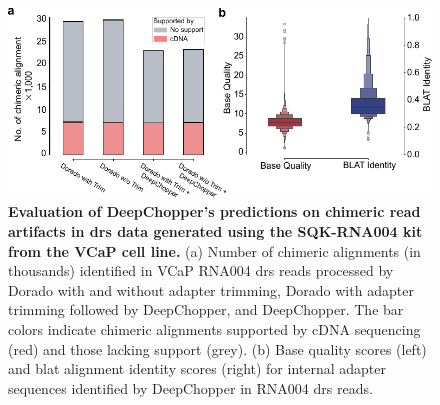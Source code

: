 \documentclass[pdflatex,sn-nature, lineno]{sn-jnl}%
\begin{document}
\begin{figure}[!ht]
	\includegraphics[height=0.41\columnwidth]{finals/sf3}
	\caption{ {\bf Evaluation of DeepChopper's predictions on chimeric read artifacts in \gls{drs} data generated using the SQK-RNA004 kit from the VCaP cell line.} (a) Number of chimeric alignments (in thousands) identified in VCaP RNA004 \gls{drs} reads processed by Dorado with and without adapter trimming, Dorado with adapter trimming followed by DeepChopper, and DeepChopper. The bar colors indicate chimeric alignments supported by cDNA sequencing (red) and those lacking support (grey). (b) Base quality scores (left) and \gls{blat} alignment identity scores (right) for internal adapter sequences identified by DeepChopper in RNA004 \gls{drs} reads.}\label{fig:sf3}
\end{figure}
\end{document}

